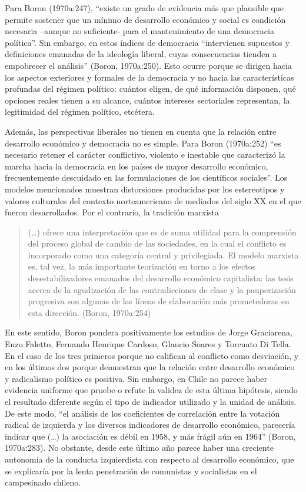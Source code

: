 Para Boron (1970a:247), ``existe un grado de evidencia más que plausible que permite sostener que un mínimo de desarrollo económico y social es condición necesaria --aunque no suficiente- para el mantenimiento de una democracia política''. Sin embargo, en estos índices de democracia ``intervienen supuestos y definiciones emanadas de la ideología liberal, cuyas consecuencias tienden a empobrecer el análisis'' (Boron, 1970a:250). Esto ocurre porque se dirigen hacia los aspectos exteriores y formales de la democracia y no hacia las características profundas del régimen político: cuántos eligen, de qué información disponen, qué opciones reales tienen a su alcance, cuántos intereses sectoriales representan, la legitimidad del régimen político, etcétera.

Además, las perspectivas liberales no tienen en cuenta que la relación entre desarrollo económico y democracia no es simple. Para Boron (1970a:252) ``es necesario retener el carácter conflictivo, violento e inestable que caracterizó la marcha hacia la democracia en los países de mayor desarrollo económico, frecuentemente descuidado en las formulaciones de los científicos sociales''. Los modelos mencionados muestran distorsiones producidas por los estereotipos y valores culturales del contexto norteamericano de mediados del siglo XX en el que fueron desarrollados. Por el contrario, la tradición marxista

\begin{quote}
(\ldots) ofrece una interpretación que es de suma utilidad para la comprensión del proceso global de cambio de las sociedades, en la cual el conflicto es incorporado como una categoría central y privilegiada. El modelo marxista es, tal vez, la más importante teorización en torno a los efectos desestabilizadores emanados del desarrollo económico capitalista: las tesis acerca de la agudización de las contradicciones de clase y la pauperización progresiva son algunas de las líneas de elaboración más prometedoras en esta dirección. (Boron, 1970a:254)
\end{quote}

En este sentido, Boron pondera positivamente los estudios de Jorge Graciarena, Enzo Faletto, Fernando Henrique Cardoso, Glaucio Soares y Torcuato Di Tella. En el caso de los tres primeros porque no califican al conflicto como desviación, y en los últimos dos porque demuestran que la relación entre desarrollo económico y radicalismo político es positiva. Sin embargo, en Chile no parece haber evidencia uniforme que pruebe o refute la validez de esta última hipótesis, siendo el resultado diferente según el tipo de indicador utilizado y la unidad de análisis. De este modo, ``el análisis de los coeficientes de correlación entre la votación radical de izquierda y los diversos indicadores de desarrollo económico, parecería indicar que (\ldots) la asociación es débil en 1958, y más frágil aún en 1964'' (Boron, 1970a:283). No obstante, desde este último año parece haber una creciente autonomía de la conducta izquierdista con respecto al desarrollo económico, que se explicaría por la lenta penetración de comunistas y socialistas en el campesinado chileno.

